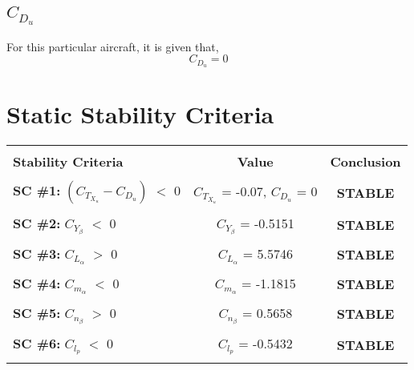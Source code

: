 \documentclass[letterpaper,12pt]{article}
\begin{document}
\subsection{$C_{D_u}$}
For this particular aircraft, it is given that,
\begin{equation*}
C_{D_u} = 0
\end{equation*}
\section{Static Stability Criteria}
\begin{center}
\begin{tabular}{lcc}
\hline \\
\textbf{Stability Criteria}&\hspace*{2cm}\textbf{Value}&\hspace*{2cm}\textbf{Conclusion}\vspace*{0.5cm}\\ \hline \\
\textbf{SC \#1:} $\left(C_{T_{X_u}} - C_{D_u}\right)$ $<$ 0 &\hspace*{2cm} $C_{T_{X_u}}$ = -0.07, $C_{D_u}$ = 0 &\hspace*{2cm} \textbf{STABLE}\\ \\
\textbf{SC \#2:} $C_{Y_\beta}$ $<$ 0 &\hspace*{2cm} $C_{Y_\beta}$ = -0.5151 &\hspace*{2cm} \textbf{STABLE}\\ \\
\textbf{SC \#3:} $C_{L_\alpha}$ $>$ 0 &\hspace*{2cm} $C_{L_\alpha}$ = 5.5746 &\hspace*{2cm} \textbf{STABLE}\\ \\
\textbf{SC \#4:} $C_{m_\alpha}$ $<$ 0 &\hspace*{2cm} $C_{m_\alpha}$ = -1.1815 &\hspace*{2cm} \textbf{STABLE}\\ \\
\textbf{SC \#5:} $C_{n_\beta}$ $>$ 0 &\hspace*{2cm} $C_{n_\beta}$ = 0.5658 &\hspace*{2cm} \textbf{STABLE}\\ \\
\textbf{SC \#6:} $C_{l_p}$ $<$ 0 &\hspace*{2cm} $C_{l_p}$ = -0.5432 &\hspace*{2cm} \textbf{STABLE}\\ \\

\end{tabular}
\end{center}
\end{document}
